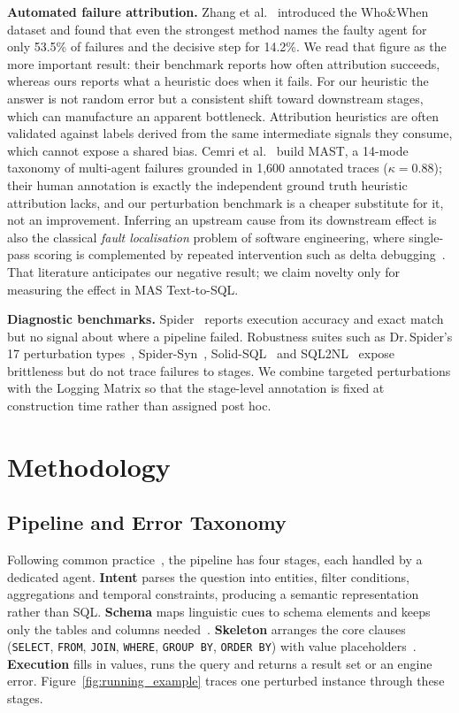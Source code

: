 \documentclass{llncs}
\begin{document}
\noindent\textbf{Automated failure attribution.} Zhang et
al.~\cite{zhang2025which} introduced the Who\&When dataset and found that even the
strongest method names the faulty agent for only 53.5\% of failures and the
decisive step for 14.2\%. We read that figure as the more important result:
their benchmark reports how often attribution succeeds, whereas ours reports
what a heuristic does when it fails. For our heuristic the answer is not
random error but a consistent shift toward downstream stages, which can
manufacture an apparent bottleneck. Attribution heuristics are often validated
against labels derived from the same intermediate signals they consume, which
cannot expose a shared bias. Cemri et al.~\cite{cemri_mast_2025} build MAST, a
14-mode taxonomy of multi-agent failures grounded in 1{,}600 annotated traces
($\kappa=0.88$); their human annotation is exactly the independent ground
truth heuristic attribution lacks, and our perturbation benchmark is a cheaper
substitute for it, not an improvement. Inferring an upstream cause from its downstream
effect is also the classical \emph{fault localisation} problem of software
engineering, where single-pass scoring is complemented by repeated
intervention such as delta debugging~\cite{zeller_delta_debugging_2002}. That literature
anticipates our negative result; we claim novelty only for measuring the effect
in MAS Text-to-SQL.

\noindent\textbf{Diagnostic benchmarks.} Spider~\cite{yu_spider_2018} reports
execution accuracy and exact match but no signal about where a pipeline
failed. Robustness suites such as Dr.\,Spider's 17 perturbation
types~\cite{chang_drspider_2023}, Spider-Syn~\cite{gan_spider_syn_2021},
Solid-SQL~\cite{liu_solid-sql_2025} and SQL2NL~\cite{safarzadeh_sql2nl_2025}
expose brittleness but do not trace failures to stages. We combine targeted
perturbations with the Logging Matrix so that the stage-level annotation is
fixed at construction time rather than assigned post hoc.

\section{Methodology}
\label{sec:methodology}

\subsection{Pipeline and Error Taxonomy}

Following common practice~\cite{shen_icl_errors_2026}, the pipeline has four
stages, each handled by a dedicated agent. \textbf{Intent} parses the question
into entities, filter conditions, aggregations and temporal constraints,
producing a semantic representation rather than SQL. \textbf{Schema} maps
linguistic cues to schema elements and keeps only the tables and columns
needed~\cite{yang_sql_to_schema_2024}. \textbf{Skeleton} arranges the core
clauses (\texttt{SELECT}, \texttt{FROM}, \texttt{JOIN}, \texttt{WHERE},
\texttt{GROUP BY}, \texttt{ORDER BY}) with value
placeholders~\cite{lei_emlc_2026}. \textbf{Execution} fills in values, runs
the query and returns a result set or an engine error. Figure~\ref{fig:running_example}
traces one perturbed instance through these stages.
\end{document}
